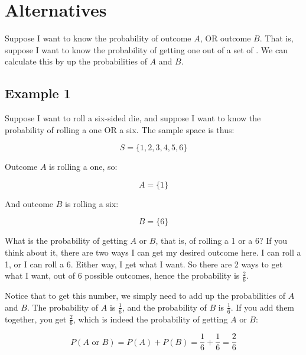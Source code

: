 \documentclass[../../../main.tex]{subfiles}
\begin{document}
\chapter{Alternatives}

Suppose I want to know the probability of outcome $A$, OR outcome $B$. That is, suppose I want to know the probability of getting one out of a set of . We can calculate this by  up the probabilities of $A$ and $B$.


\section{Example 1}

Suppose I want to roll a six-sided die, and suppose I want to know the probability of rolling a one OR a six. The sample space is thus:

\begin{equation*}
  S = \{ 1, 2, 3, 4, 5, 6 \}
\end{equation*}

\noindent
Outcome $A$ is rolling a one, so:

\begin{equation*}
  A = \{ 1 \}
\end{equation*}

\noindent
And outcome $B$ is rolling a six:

\begin{equation*}
  B = \{ 6 \}
\end{equation*}

\noindent
What is the probability of getting $A$ or $B$, that is, of rolling a 1 or a 6? If you think about it, there are two ways I can get my desired outcome here. I can roll a 1, or I can roll a 6. Either way, I get what I want. So there are 2 ways to get what I want, out of 6 possible outcomes, hence the probability is $\frac{2}{6}$.

Notice that to get this number, we simply need to add up the probabilities of $A$ and $B$. The probability of $A$ is $\frac{1}{6}$, and the probability of $B$ is $\frac{1}{6}$. If you add them together, you get $\frac{2}{6}$, which is indeed the probability of getting $A$ or $B$:

\begin{equation*}
  P(A \text{ or } B) = P(A) + P(B) = \frac{1}{6} + \frac{1}{6} = \frac{2}{6}
\end{equation*}
\end{document}
